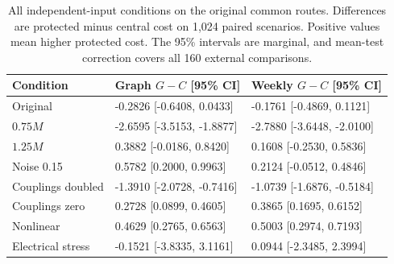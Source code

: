 \begin{table}[t]
\centering
\caption{All independent-input conditions on the original common routes. Differences are protected minus central cost on 1,024 paired scenarios. Positive values mean higher protected cost. The 95\% intervals are marginal, and mean-test correction covers all 160 external comparisons.}
\label{tab:guarded-external-published}
\footnotesize\setlength{\tabcolsep}{3pt}\renewcommand{\arraystretch}{1.12}
\begin{tabular}{@{}p{}p{}p{}@{}}
\toprule
Condition & Graph $G-C$ [95\% CI] & Weekly $G-C$ [95\% CI] \\
\midrule
Original & -0.2826 [-0.6408, 0.0433] & -0.1761 [-0.4869, 0.1121] \\
$0.75M$ & -2.6595 [-3.5153, -1.8877] & -2.7880 [-3.6448, -2.0100] \\
$1.25M$ & 0.3882 [-0.0186, 0.8420] & 0.1608 [-0.2530, 0.5836] \\
Noise 0.15 & 0.5782 [0.2000, 0.9963] & 0.2124 [-0.0512, 0.4846] \\
Couplings doubled & -1.3910 [-2.0728, -0.7416] & -1.0739 [-1.6876, -0.5184] \\
Couplings zero & 0.2728 [0.0899, 0.4605] & 0.3865 [0.1695, 0.6152] \\
Nonlinear & 0.4629 [0.2765, 0.6563] & 0.5003 [0.2974, 0.7193] \\
Electrical stress & -0.1521 [-3.8335, 3.1161] & 0.0944 [-2.3485, 2.3994] \\
\bottomrule
\end{tabular}
\end{table}

